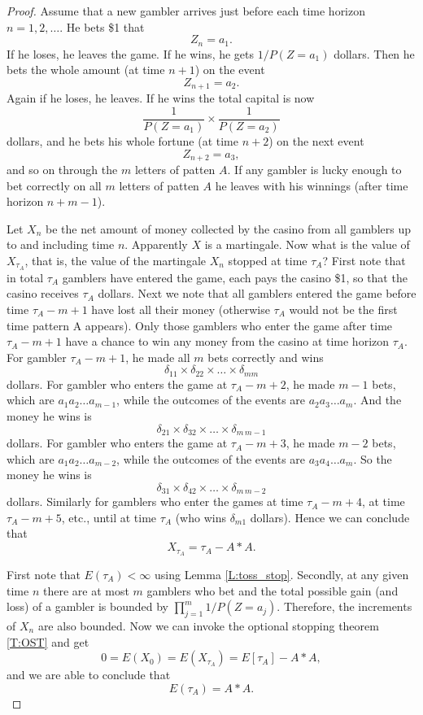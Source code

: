 \begin{proof}
Assume that a new gambler arrives just before each time horizon $n=1,2, \dots$.
He bets \$1 that 
\[
  Z_n=a_1.
\]
If he loses, he leaves the game. If he wins, he gets $1/P(Z=a_1)$ dollars. Then
he bets the whole amount (at time $n+1$) on the event
\[
  Z_{n+1}=a_2.
\]
Again if he loses, he leaves. If he wins the total capital is now
\[
  \frac{1}{P(Z=a_1)} \times \frac{1}{P(Z=a_2)} 
\]
dollars, and he bets his whole fortune (at time $n+2$) on the next event
\[
  Z_{n+2}=a_3,
\]
and so on through the $m$ letters of patten $A$. If any gambler is lucky enough
to bet correctly on all $m$ letters of patten $A$ he leaves with his winnings
(after time horizon $n+m-1$).

Let $X_n$ be the net amount of money collected by the casino from all gamblers
up to and including time $n$. Apparently $X$ is a martingale.
Now what is the value of $X_{\tau_A}$, that is, 
the value of the martingale $X_n$ stopped at time $\tau_A$? First note that in
total $\tau_A$ gamblers have entered the game, each pays the casino \$1, so that
the casino receives $\tau_A$ dollars. Next we note that all gamblers entered the
game before time $\tau_A-m+1$ have lost all their money (otherwise $\tau_A$
would not be the first time pattern A appears). Only those gamblers who enter
the game after time $\tau_A-m+1$ have a chance to
win any money from the casino at time horizon $\tau_A$. For gambler 
$\tau_A-m+1$, he made all $m$ bets correctly and wins
\[
  \delta_{11}\times\delta_{22}\times\dots \times \delta_{mm}
\]
dollars. For gambler who enters the game at $\tau_A-m+2$, he made $m-1$ bets, 
which are $a_1 a_2 \dots a_{m-1}$, while the outcomes of the events are 
$a_2 a_3 \dots a_m$. And the money he wins is
\[
  \delta_{21}\times\delta_{32}\times\dots \times \delta_{m\, m-1}
\]
dollars. For gambler who enters the game at $\tau_A-m+3$, he made $m-2$ bets, 
which are $a_1 a_2 \dots a_{m-2}$, while the outcomes of the events are 
$a_3 a_4 \dots a_m$. So the money he wins is
\[
  \delta_{31}\times\delta_{42}\times\dots \times \delta_{m\, m-2}
\]
dollars. Similarly for gamblers who enter the games at time $\tau_A-m+4$,
at time $\tau_A-m+5$, etc., until at time $\tau_A$ (who wins $\delta_{m1}$
dollars). Hence we can conclude that
\[
  X_{\tau_A} = \tau_A - A \ast A.
\]

First note that $E(\tau_A)<\infty$ using Lemma \ref{L:toss_stop}.
Secondly, at any given time $n$ there are at most $m$ gamblers who bet and
the total possible gain (and loss) of a gambler is bounded by
$\prod_{j=1}^m 1/P(Z=a_j)$. Therefore, the increments of $X_n$ are also
bounded.
Now we can invoke the optional stopping theorem \ref{T:OST} and get
\[
  0=E(X_0)=E(X_{\tau_A})=E[\tau_A] - A \ast A,
\]
and we are able to conclude that
\[
  E(\tau_A)=A \ast A.
\]
\end{proof}

